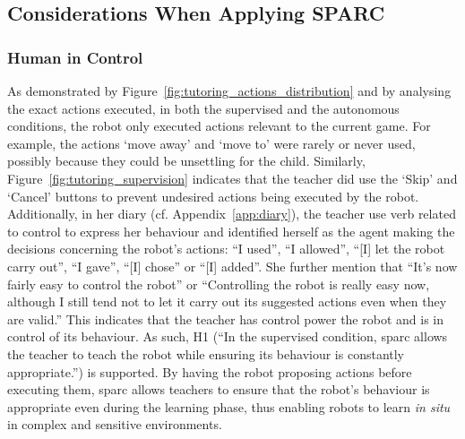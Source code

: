 

\subsection{Considerations When Applying SPARC}

\subsubsection{Human in Control}\label{sec:tuto_control}

As demonstrated by Figure~\ref{fig:tutoring_actions_distribution} and by analysing the exact actions executed, in both the supervised and the autonomous conditions, the robot only executed actions relevant to the current game. For example, the actions `move away' and `move to' were rarely or never used, possibly because they could be unsettling for the child. Similarly, Figure~\ref{fig:tutoring_supervision} indicates that the teacher did use the `Skip' and `Cancel' buttons to prevent undesired actions being executed by the robot. Additionally, in her diary (cf. Appendix~\ref{app:diary}), the teacher use verb related to control to express her behaviour and identified herself as the agent making the decisions concerning the robot's actions: ``I used'', ``I allowed'', ``[I] let the robot carry out'', ``I gave'', ``[I] chose'' or ``[I] added''. She further mention that ``It’s now fairly easy to control the robot'' or ``Controlling the robot is really easy now, although I still tend not to let it carry out its suggested actions even when they are valid.'' This indicates that the teacher has control power the robot and is in control of its behaviour. As such, H1 (``In the supervised condition, \gls{sparc} allows the teacher to teach the robot while ensuring its behaviour is constantly appropriate.'') is supported. By having the robot proposing actions before executing them, \gls{sparc} allows teachers to ensure that the robot's behaviour is appropriate even during the learning phase, thus enabling robots to learn \emph{in situ} in complex and sensitive environments.

